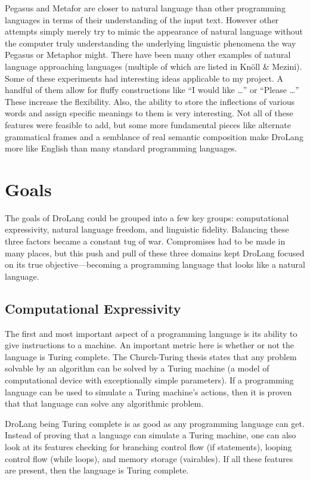 \documentclass[titlepage]{article}
\newcommand{\langName}{DroLang}
\begin{document}
Pegasus and Metafor are closer to natural language than other programming languages in terms of their understanding of the input text. However other attempts simply merely try to mimic the appearance of natural language without the computer truly understanding the underlying linguistic phenomena the way Pegasus or Metaphor might. There have been many other examples of natural language approaching languages (multiple of which are listed in Knöll \& Mezini). Some of these experiments had interesting ideas applicable to my project. A handful of them allow for fluffy constructions like “I would like …” or “Please …” These increase the flexibility. Also, the ability to store the inflections of various words and assign specific meanings to them is very interesting. Not all of these features were feasible to add, but some more fundamental pieces like alternate grammatical frames and a semblance of real semantic composition make \langName{} more like English than many standard programming languages.

\section*{Goals}
The goals of \langName{} could be grouped into a few key groups: computational expressivity, natural language freedom, and linguistic fidelity. Balancing these three factors became a constant tug of war. Compromises had to be made in many places, but this push and pull of these three domains kept \langName{} focused on its true objective---becoming a programming language that looks like a natural language.

\subsection*{Computational Expressivity}
The first and most important aspect of a programming language is its ability to give instructions to a machine. An important metric here is whether or not the language is Turing complete. The Church-Turing thesis states that any problem solvable by an algorithm can be solved by a Turing machine (a model of computational device with exceptionally simple parameters). If a programming language can be used to simulate a Turing machine's actions, then it is proven that that language can solve any algorithmic problem.

\langName{} being Turing complete is as good as any programming language can get. Instead of proving that a language can simulate a Turing machine, one can also look at its features checking for branching control flow (if statements), looping control flow (while loops), and memory storage (vairables). If all these features are present, then the language is Turing complete.
\end{document}
